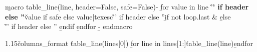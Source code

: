 \b{macro table_line(line, header=False, safe=False)-}
\b{for value in line}
\v{'\textbf{' if header else ''}\v{value if safe else value|texesc}\v{'}' if header else ''}\b{if not loop.last} & \b{else} \\\v{'\midrule\endhead' if header else ''}
\b{endif}
\b{endfor}
\b{- endmacro}

\small

\renewcommand\arraystretch{1.2}

\begin{spacing}{.9}
\setlength\LTleft{-.5in}
\setlength\LTright{-.5in}
\begin{tabularx}{1.15\linewidth}{\v{columns_format}}
\toprule
\v{table_line(lines[0])}
\midrule
\b{for line in lines[1:]}\v{table_line(line)}\b{endfor}\bottomrule
\end{tabularx}
\end{spacing}
